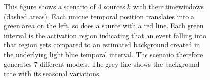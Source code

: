\begin{figure}
{}
  \caption{This figure shows a scenario of $\num{4}$ sources $k$ with their timewindows (dashed areas). Each unique temporal position translates into a green area on the left, so does a source with a red line. Each green interval is the activation region indicating that an event falling into that region gets compared to an estimated background created in the underlying light blue temporal interval. The scenario therefore generates $\num{7}$ different models. The grey line shows the background rate with its seasonal variations.}
  \label{fig:activation}
\end{figure}
